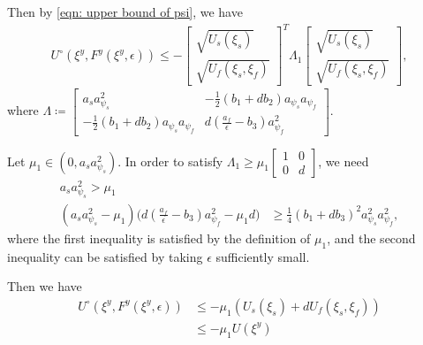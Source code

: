 Then by \eqref{eqn: upper bound of psi}, we have
\begin{equation*}
    \begin{aligned}
        U^\circ(\xi^y, F^y(\xi^y, \epsilon)) \leq - 
        \begin{bmatrix}
            \sqrt{U_s(\xi_s)} \\ \sqrt{U_f(\xi_s, \xi_f)}
        \end{bmatrix}^T
        \Lambda_1
        \begin{bmatrix}
            \sqrt{U_s(\xi_s)} \\ \sqrt{U_f(\xi_s, \xi_f)}
        \end{bmatrix},
    \end{aligned}
\end{equation*}
where $\Lambda \coloneqq 
    \begin{bmatrix}
        a_s a_{\psi_s}^2 & -\tfrac{1}{2}(b_1 + d b_2)a_{\psi_s}a_{\psi_f} \\
        -\tfrac{1}{2}(b_1 + d b_2)a_{\psi_s}a_{\psi_f} & d (\tfrac{a_f}{\epsilon} - b_3)a_{\psi_f}^2
    \end{bmatrix}$. 

    Let $\mu_1 \in (0, a_s a_{\psi_s}^2)$. In order to satisfy $\Lambda_1 \geq \mu_1
    \begin{bmatrix}
        1 & 0 \\ 0 & d
    \end{bmatrix}$, we need 
    \begin{subequations}
\begin{align}
    a_s a_{\psi_s}^2 > \mu_1 \\
    (a_s a_{\psi_s}^2-\mu_1) \big( d (\tfrac{a_f}{\epsilon} - b_3)a_{\psi_f}^2 - \mu_1 d \big) &\geq \tfrac{1}{4}(b_1 + db_3)^2a_{\psi_s}^2a_{\psi_f}^2, \label{eqn: inequality of epsilon Exponential}
\end{align}
\end{subequations}
where the first inequality is satisfied by the definition of $\mu_1$, and the second inequality can be satisfied by taking $\epsilon$ sufficiently small.

Then we have 
\begin{equation}
    \begin{aligned}
        U^\circ(\xi^y, F^y(\xi^y, \epsilon)) &\leq -\mu_1 (U_s(\xi_s) + d U_f(\xi_s,\xi_f)) \\
        & \leq - \mu_1 U(\xi^y)
    \end{aligned}
\end{equation}


